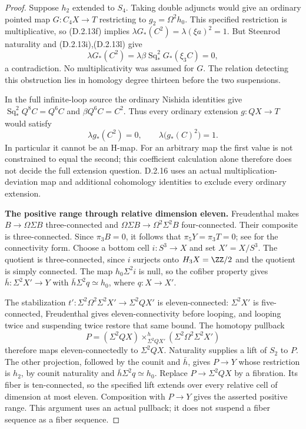 \begin{proof}
Suppose $h_2$ extended to $S_4$. Taking double adjuncts would give
an ordinary pointed map $G:C_4X\to T$ restricting to
$g_2=\Omega^2h_0$. This specified restriction is multiplicative,
so \textup{(D.2.13f)} implies
$\lambda G_*(C^2)=\lambda(\xi a)^2=1$.
But Steenrod naturality and \textup{(D.2.13i),(D.2.13l)} give
\[
 \lambda G_*(C^2)
   =\lambda\beta\operatorname{Sq}_*^2G_*(\xi_3C)=0,
 \tag{D.2.13m}
\]
a contradiction. No multiplicativity was assumed for $G$.
The relation detecting this obstruction lies in homology degree
thirteen before the two suspensions.

In the full infinite-loop source the ordinary Nishida identities
give $\operatorname{Sq}_*^2Q^8C=Q^6C$ and $\beta Q^6C=C^2$.
Thus every ordinary extension $g:QX\to T$ would satisfy
\[
 \lambda g_*(C^2)=0,
 \qquad \lambda\bigl(g_*(C)^2\bigr)=1.
 \tag{D.2.13n}
\]
In particular it cannot be an H-map. For an arbitrary map the
first value is not constrained to equal the second; this coefficient
calculation alone therefore does not decide the full extension
question. D.2.16 uses an actual multiplication-deviation map and
additional cohomology identities to exclude every ordinary extension.

\medskip\noindent
\textbf{The positive range through relative dimension eleven.}
Freudenthal makes $B\to\Omega\Sigma B$ three-connected and
$\Omega\Sigma B\to\Omega^2\Sigma^2B$ four-connected.
Their composite is three-connected. Since $\pi_3B=0$, it follows
that $\pi_5Y=\pi_3T=0$; see
\cite[Corollary~4.24]{FGHHatcher2002} for the connectivity form.
Choose a bottom cell $i:S^3\to X$ and set $X'=X/S^3$.
The quotient is three-connected, since $i$ surjects onto
$H_3X=\ZZ/2$ and the quotient is simply connected.
The map $h_0\Sigma^2i$ is null, so the cofiber property gives
$\bar h:\Sigma^2X'\to Y$ with $\bar h\Sigma^2q\simeq h_0$,
where $q:X\to X'$.

The stabilization
$t':\Sigma^2\Omega^2\Sigma^2X'\to\Sigma^2QX'$
is eleven-connected: $\Sigma^2X'$ is five-connected,
Freudenthal gives eleven-connectivity before looping, and
looping twice and suspending twice restore that same bound.
The homotopy pullback
\[
 P=(\Sigma^2QX)\times^h_{\Sigma^2QX'}
                 (\Sigma^2\Omega^2\Sigma^2X')
 \tag{D.2.13o}
\]
therefore maps eleven-connectedly to $\Sigma^2QX$.
Naturality supplies a lift of $S_2$ to $P$. The other projection,
followed by the counit and $\bar h$, gives $P\to Y$ whose
restriction is $h_2$, by counit naturality and
$\bar h\Sigma^2q\simeq h_0$.
Replace $P\to\Sigma^2QX$ by a fibration. Its fiber is
ten-connected, so the specified lift extends over every relative
cell of dimension at most eleven. Composition with $P\to Y$
gives the asserted positive range. This argument uses an actual
pullback; it does not suspend a fiber sequence as a fiber sequence.


\end{proof}
